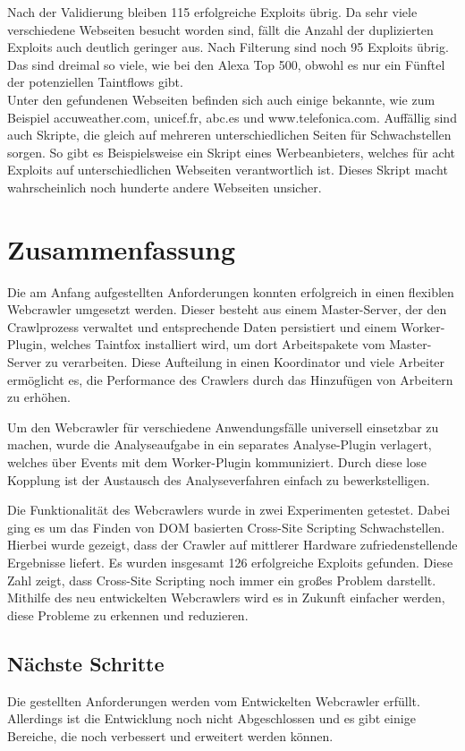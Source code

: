 Nach der Validierung bleiben 115 erfolgreiche Exploits übrig. Da sehr viele verschiedene Webseiten besucht worden sind, fällt die Anzahl der duplizierten Exploits auch deutlich geringer aus. Nach Filterung sind noch 95 Exploits übrig. Das sind dreimal so viele, wie bei den Alexa Top 500, obwohl es nur ein Fünftel der potenziellen Taintflows gibt. \\
Unter den gefundenen Webseiten befinden sich auch einige bekannte, wie zum Beispiel accuweather.com, unicef.fr, abc.es und www.telefonica.com. Auffällig sind auch Skripte, die gleich auf mehreren unterschiedlichen Seiten für Schwachstellen sorgen. So gibt es Beispielsweise ein Skript eines Werbeanbieters, welches für acht Exploits auf unterschiedlichen Webseiten verantwortlich ist. Dieses Skript macht wahrscheinlich noch hunderte andere Webseiten unsicher.

\chapter{Zusammenfassung}
Die am Anfang aufgestellten Anforderungen konnten erfolgreich in einen flexiblen Webcrawler umgesetzt werden. Dieser besteht aus einem Master-Server, der den Crawlprozess verwaltet und entsprechende Daten persistiert und einem Worker-Plugin, welches Taintfox installiert wird, um dort Arbeitspakete vom Master-Server zu verarbeiten. Diese Aufteilung in einen Koordinator und viele Arbeiter ermöglicht es, die Performance des Crawlers durch das Hinzufügen von Arbeitern zu erhöhen. 

Um den Webcrawler für verschiedene Anwendungsfälle universell einsetzbar zu machen, wurde die Analyseaufgabe in ein separates Analyse-Plugin verlagert, welches über Events mit dem Worker-Plugin kommuniziert. Durch diese lose Kopplung ist der Austausch des Analyseverfahren einfach zu bewerkstelligen.

Die Funktionalität des Webcrawlers wurde in zwei Experimenten getestet. Dabei ging es um das Finden von DOM basierten Cross-Site Scripting Schwachstellen. Hierbei wurde gezeigt, dass der Crawler auf mittlerer Hardware zufriedenstellende Ergebnisse liefert. Es wurden insgesamt 126 erfolgreiche Exploits gefunden. Diese Zahl zeigt, dass Cross-Site Scripting noch immer ein großes Problem darstellt. Mithilfe des neu entwickelten Webcrawlers wird es in Zukunft einfacher werden, diese Probleme zu erkennen und reduzieren.

\section{Nächste Schritte}
Die gestellten Anforderungen werden vom Entwickelten Webcrawler erfüllt. Allerdings ist die Entwicklung noch nicht Abgeschlossen und es gibt einige Bereiche, die noch verbessert und erweitert werden können. 

